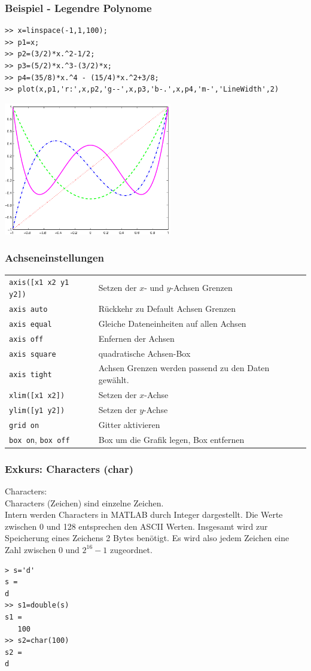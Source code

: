 % 
% 
\begin{frame}[fragile]\frametitle{Beispiel - Legendre Polynome}
\begin{lstlisting}[basicstyle=\scriptsize]
>> x=linspace(-1,1,100);
>> p1=x;
>> p2=(3/2)*x.^2-1/2;
>> p3=(5/2)*x.^3-(3/2)*x;
>> p4=(35/8)*x.^4 - (15/4)*x.^2+3/8;
>> plot(x,p1,'r:',x,p2,'g--',x,p3,'b-.',x,p4,'m-','LineWidth',2)
\end{lstlisting}
\hfil\includegraphics[width=0.55\textwidth]{./figures/grafik_4}\hfil
\end{frame}
% 
% 
\begin{frame}[fragile]\frametitle{Achseneinstellungen}
\begin{tabular}{p{3cm}p{8cm}}
\lstinline!axis([x1 x2 y1 y2])! & Setzen der $x$- und $y$-Achsen
Grenzen\\
\lstinline!axis auto! & Rückkehr zu Default Achsen Grenzen\\
\lstinline!axis equal! & Gleiche Dateneinheiten auf allen Achsen\\
\lstinline!axis off! & Enfernen der Achsen\\
\lstinline!axis square! & quadratische Achsen-Box\\
\lstinline!axis tight! & Achsen Grenzen werden passend zu den Daten
gewählt. \\
\lstinline!xlim([x1 x2])! & Setzen der $x$-Achse\\
\lstinline!ylim([y1 y2])! & Setzen der $y$-Achse\\
\lstinline!grid on! & Gitter aktivieren\\
\lstinline!box on!, \lstinline!box off!  & Box um die Grafik
legen, Box entfernen
\end{tabular}
\end{frame}
%
%
\begin{frame}[fragile]\frametitle{Exkurs: Characters (char)}
\alert{Characters:} \\
Characters (Zeichen) sind einzelne
Zeichen. \\

Intern werden Characters in MATLAB durch Integer dargestellt. Die Werte zwischen 0 und
128 entsprechen den ASCII Werten. Insgesamt wird zur Speicherung eines Zeichens 2
Bytes ben\"otigt. Es wird also jedem Zeichen eine Zahl zwischen 0 und $2^{16}-1$
zugeordnet. 
\begin{lstlisting}
> s='d'
s =
d
>> s1=double(s)
s1 =
   100
>> s2=char(100)
s2 =
d
\end{lstlisting}
\end{frame}

